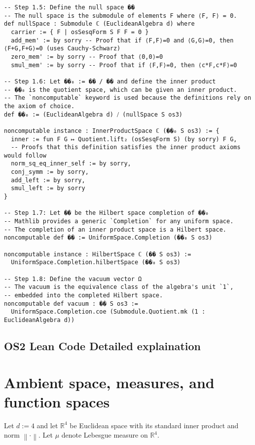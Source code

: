\documentclass{article}
\newcommand{\Rd}{\mathbb{R}^4}
\newcommand{\norm}[1]{\left\lVert #1 \right\rVert}
\newcommand{\1}{\mathbbm{1}}
\theoremstyle{plain}
\theoremstyle{definition}
\numberwithin{equation}{section}
\begin{document}
\begin{lstlisting}
-- Step 1.5: Define the null space ��
-- The null space is the submodule of elements F where ⟨F, F⟩ = 0.
def nullSpace : Submodule ℂ (EuclideanAlgebra d) where
  carrier := { F | osSesqForm S F F = 0 }
  add_mem' := by sorry -- Proof that if ⟨F,F⟩=0 and ⟨G,G⟩=0, then ⟨F+G,F+G⟩=0 (uses Cauchy-Schwarz)
  zero_mem' := by sorry -- Proof that ⟨0,0⟩=0
  smul_mem' := by sorry -- Proof that if ⟨F,F⟩=0, then ⟨c*F,c*F⟩=0

-- Step 1.6: Let ��₀ := �� / �� and define the inner product
-- ��₀ is the quotient space, which can be given an inner product.
-- The `noncomputable` keyword is used because the definitions rely on the axiom of choice.
def ��₀ := (EuclideanAlgebra d) ⧸ (nullSpace S os3)

noncomputable instance : InnerProductSpace ℂ (��₀ S os3) := {
  inner := fun F G ↦ Quotient.lift₂ (osSesqForm S) (by sorry) F G,
  -- Proofs that this definition satisfies the inner product axioms would follow
  norm_sq_eq_inner_self := by sorry,
  conj_symm := by sorry,
  add_left := by sorry,
  smul_left := by sorry
}

-- Step 1.7: Let �� be the Hilbert space completion of ��₀
-- Mathlib provides a generic `Completion` for any uniform space.
-- The completion of an inner product space is a Hilbert space.
noncomputable def �� := UniformSpace.Completion (��₀ S os3)

noncomputable instance : HilbertSpace ℂ (�� S os3) :=
  UniformSpace.Completion.hilbertSpace (��₀ S os3)

-- Step 1.8: Define the vacuum vector Ω
-- The vacuum is the equivalence class of the algebra's unit `1`,
-- embedded into the completed Hilbert space.
noncomputable def vacuum : �� S os3 :=
  UniformSpace.Completion.coe (Submodule.Quotient.mk (1 : EuclideanAlgebra d))
\end{lstlisting}

\subsection{OS2 Lean Code Detailed explaination}


\section{Ambient space, measures, and function spaces}

Let $d:=4$ and let $\Rd$ be Euclidean space with its standard inner product and norm $\norm{\cdot}$. Let $\mu$ denote Lebesgue measure on $\Rd$.
\end{document}
